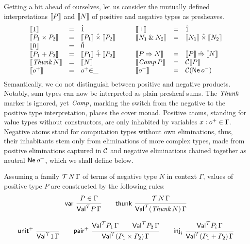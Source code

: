 \documentclass[a4paper,USenglish,cleveref, autoref]{lipics-v2019}
\begin{document}
Getting a bit ahead of ourselves, let us consider the
mutually defined interpretations
$\mathopen{{[\kern-0.14em[}} P \mathclose{{]\kern-0.14em]}}$ and $\mathopen{{[\kern-0.14em[}} N \mathclose{{]\kern-0.14em]}}$ of positive and negative types as presheaves.
\[
\begin{array}{lcl}
  \den{\tyone} & = & \hatone \\
  \den{P_1 \times P_2} & = & \den{P_1} \hattimes \den{P_2} \\
  \den{\tyzero} & = & \hatzero \\
  \den{P_1 + P_2} & = & \den{P_1} \hatplus \den{P_2} \\
  \den{\Thunk N} & = & \den N \\
  \den{\patom} & = & \patom{\in}\_ \\
\end{array}
\qquad
\begin{array}{lcl}
  \den{\top} & = & \hatone \\
  \den{N_1 \ntimes N_2} & = & \den{N_1} \hattimes \den{N_2} \\
  \\
  \den{P \To N} & = & \den P \hatto \den N \\
  \den{\Comp P} & = & \C \den P \\
  \den{\natom}  & = & \C (\tNe\, \natom) \\
\end{array}
\]
Semantically, we do not distinguish between positive and negative
products.  Notably, sum types can now be interpreted as plain presheaf
sums.  The $\mathit{Thunk}$ marker is ignored, yet $\mathit{Comp}$, marking the
switch from the negative to the positive type interpretation, places
the cover monad.  Positive atoms, standing for value types without
constructors, are only inhabited by variables $x : o^+ \in \Gamma$.
Negative atoms stand for computation types without own eliminations,
thus, their inhabitants stem only from eliminations of more complex
types, made from positive eliminations captured in $\mathcal{C}$ and negative
eliminations chained together as neutral $\mathsf{Ne}^{}\,o^-$, which we
shall define below.


Assuming a family $\mathcal{T}\,N\,\Gamma$ of terms of negative type $N$ in
context $\Gamma$, values 
of positive type $P$ are constructed by the
following rules:
\begin{gather*}
  \nru{\tvar}{P \in \Gamma}{\PValT P \Gamma}
\qquad
  \nru{\tthunk}{\T\,N\,\Gamma}{\PValTP{\Thunk N}\Gamma}
\\[2ex]
  \nru{\punit}{}{\PValT{\tyone}\Gamma}
\qquad
  \nru{\ppair}
      {\PValT{P_1}\Gamma \qquad \PValT{P_2}\Gamma}
      {\PValTP{P_1 \times P_2}\Gamma}
\qquad
  \nru{\tinj_i}{\PValT{P_i}\Gamma}{\PValTP{P_1 + P_2}\Gamma}
\end{gather*}
\end{document}
